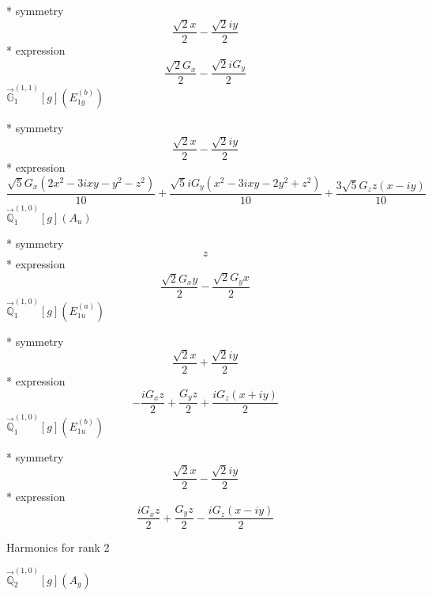 \documentclass[fleqn,8pt]{jsarticle}
\begin{document}
\noindent\quad ** symmetry
\begin{dmath*}
\frac{\sqrt{2} x}{2} - \frac{\sqrt{2} i y}{2}
\end{dmath*}
\noindent\quad ** expression
\begin{dmath*}
\frac{\sqrt{2} G_{x}}{2} - \frac{\sqrt{2} i G_{y}}{2}
\end{dmath*}
\noindent\quad $\vec{\mathbb{G}}_{1}^{(1,1)}[g](E_{1g}^{(b)})$

\noindent\quad ** symmetry
\begin{dmath*}
\frac{\sqrt{2} x}{2} - \frac{\sqrt{2} i y}{2}
\end{dmath*}
\noindent\quad ** expression
\begin{dmath*}
\frac{\sqrt{5} G_{x} \left(2 x^{2} - 3 i x y - y^{2} - z^{2}\right)}{10} + \frac{\sqrt{5} i G_{y} \left(x^{2} - 3 i x y - 2 y^{2} + z^{2}\right)}{10} + \frac{3 \sqrt{5} G_{z} z \left(x - i y\right)}{10}
\end{dmath*}
\noindent\quad $\vec{\mathbb{Q}}_{1}^{(1,0)}[g](A_{u})$

\noindent\quad ** symmetry
\begin{dmath*}
z
\end{dmath*}
\noindent\quad ** expression
\begin{dmath*}
\frac{\sqrt{2} G_{x} y}{2} - \frac{\sqrt{2} G_{y} x}{2}
\end{dmath*}
\noindent\quad $\vec{\mathbb{Q}}_{1}^{(1,0)}[g](E_{1u}^{(a)})$

\noindent\quad ** symmetry
\begin{dmath*}
\frac{\sqrt{2} x}{2} + \frac{\sqrt{2} i y}{2}
\end{dmath*}
\noindent\quad ** expression
\begin{dmath*}
- \frac{i G_{x} z}{2} + \frac{G_{y} z}{2} + \frac{i G_{z} \left(x + i y\right)}{2}
\end{dmath*}
\noindent\quad $\vec{\mathbb{Q}}_{1}^{(1,0)}[g](E_{1u}^{(b)})$

\noindent\quad ** symmetry
\begin{dmath*}
\frac{\sqrt{2} x}{2} - \frac{\sqrt{2} i y}{2}
\end{dmath*}
\noindent\quad ** expression
\begin{dmath*}
\frac{i G_{x} z}{2} + \frac{G_{y} z}{2} - \frac{i G_{z} \left(x - i y\right)}{2}
\end{dmath*}

\noindent * Harmonics for rank 2

\noindent\quad $\vec{\mathbb{Q}}_{2}^{(1,0)}[g](A_{g})$
\end{document}
